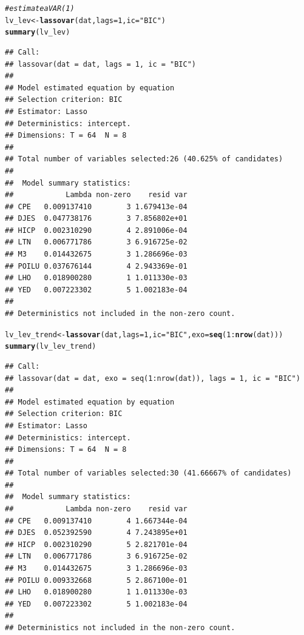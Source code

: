 \documentclass[11pt,oneside, a4paper]{amsart}\usepackage[]{graphicx}\usepackage[]{color}
\makeatletter
\newcommand{\hlnum}[1]{\textcolor[rgb]{0.686,0.059,0.569}{#1}}%
\newcommand{\hlstr}[1]{\textcolor[rgb]{0.192,0.494,0.8}{#1}}%
\newcommand{\hlcom}[1]{\textcolor[rgb]{0.678,0.584,0.686}{\textit{#1}}}%
\newcommand{\hlopt}[1]{\textcolor[rgb]{0,0,0}{#1}}%
\newcommand{\hlstd}[1]{\textcolor[rgb]{0.345,0.345,0.345}{#1}}%
\newcommand{\hlkwb}[1]{\textcolor[rgb]{0.69,0.353,0.396}{#1}}%
\newcommand{\hlkwc}[1]{\textcolor[rgb]{0.333,0.667,0.333}{#1}}%
\newcommand{\hlkwd}[1]{\textcolor[rgb]{0.737,0.353,0.396}{\textbf{#1}}}%
\newenvironment{kframe}{%
 \def\at@end@of@kframe{}%
 \ifinner\ifhmode%
  \def\at@end@of@kframe{\end{minipage}}%
  \begin{minipage}{\columnwidth}%
 \fi\fi%
 \def\FrameCommand##1{\hskip\@totalleftmargin \hskip-\fboxsep
 \colorbox{shadecolor}{##1}\hskip-\fboxsep
     \hskip-\linewidth \hskip-\@totalleftmargin \hskip\columnwidth}%
 \MakeFramed {\advance\hsize-\width
   \@totalleftmargin\z@ \linewidth\hsize
   \@setminipage}}%
 {\par\unskip\endMakeFramed%
 \at@end@of@kframe}
\newenvironment{knitrout}{}{} %
\makeatother
\begin{document}
\begin{knitrout}
\color{fgcolor}\begin{kframe}
\begin{alltt}
\hlcom{# estimate a VAR(1)}
\hlstd{lv_lev}\hlkwb{<-}\hlkwd{lassovar}\hlstd{(dat,}\hlkwc{lags}\hlstd{=}\hlnum{1}\hlstd{,} \hlkwc{ic}\hlstd{=}\hlstr{"BIC"}\hlstd{)}
\hlkwd{summary}\hlstd{(lv_lev)}
\end{alltt}
\begin{verbatim}
## Call:
## lassovar(dat = dat, lags = 1, ic = "BIC")
## 
## Model estimated equation by equation
## Selection criterion: BIC
## Estimator: Lasso
## Deterministics: intercept.
## Dimensions: T = 64  N = 8
## 
## Total number of variables selected:26 (40.625% of candidates)
## 
##  Model summary statistics:
##            Lambda non-zero    resid var
## CPE   0.009137410        3 1.679413e-04
## DJES  0.047738176        3 7.856802e+01
## HICP  0.002310290        4 2.891006e-04
## LTN   0.006771786        3 6.916725e-02
## M3    0.014432675        3 1.286696e-03
## POILU 0.037676144        4 2.943369e-01
## LHO   0.018900280        1 1.011330e-03
## YED   0.007223302        5 1.002183e-04
## 
## Deterministics not included in the non-zero count.
\end{verbatim}
\begin{alltt}
\hlstd{lv_lev_trend}\hlkwb{<-}\hlkwd{lassovar}\hlstd{(dat,}\hlkwc{lags}\hlstd{=}\hlnum{1}\hlstd{,} \hlkwc{ic}\hlstd{=}\hlstr{"BIC"}\hlstd{,}\hlkwc{exo}\hlstd{=}\hlkwd{seq}\hlstd{(}\hlnum{1}\hlopt{:}\hlkwd{nrow}\hlstd{(dat)))}
\hlkwd{summary}\hlstd{(lv_lev_trend)}
\end{alltt}
\begin{verbatim}
## Call:
## lassovar(dat = dat, exo = seq(1:nrow(dat)), lags = 1, ic = "BIC")
## 
## Model estimated equation by equation
## Selection criterion: BIC
## Estimator: Lasso
## Deterministics: intercept.
## Dimensions: T = 64  N = 8
## 
## Total number of variables selected:30 (41.66667% of candidates)
## 
##  Model summary statistics:
##            Lambda non-zero    resid var
## CPE   0.009137410        4 1.667344e-04
## DJES  0.052392590        4 7.243895e+01
## HICP  0.002310290        5 2.821701e-04
## LTN   0.006771786        3 6.916725e-02
## M3    0.014432675        3 1.286696e-03
## POILU 0.009332668        5 2.867100e-01
## LHO   0.018900280        1 1.011330e-03
## YED   0.007223302        5 1.002183e-04
## 
## Deterministics not included in the non-zero count.
\end{verbatim}

\end{kframe}
\end{knitrout}
\end{document}
